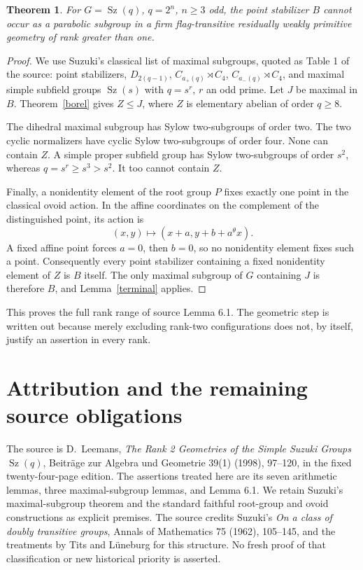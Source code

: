 \documentclass[11pt,a4paper]{article}
\newtheorem{theorem}{Theorem}
\newcommand{\Sz}{\operatorname{Sz}}
\begin{document}
\begin{theorem}\label{exclude}
For $G=\Sz(q)$, $q=2^n$, $n\ge3$ odd, the point stabilizer $B$
cannot occur as a parabolic subgroup in a firm flag-transitive
residually weakly primitive geometry of rank greater than one.
\end{theorem}
\begin{proof}
We use Suzuki's classical list of maximal subgroups, quoted as
Table 1 of the source: point stabilizers, $D_{2(q-1)}$,
$C_{a_+(q)}\rtimes C_4$, $C_{a_-(q)}\rtimes C_4$, and maximal
simple subfield groups $\Sz(s)$ with $q=s^r$, $r$ an odd prime.
Let $J$ be maximal in $B$. Theorem~\ref{borel} gives $Z\le J$,
where $Z$ is elementary abelian of order $q\ge8$.

The dihedral maximal subgroup has Sylow two-subgroups of order
two. The two cyclic normalizers have cyclic Sylow two-subgroups
of order four. None can contain $Z$. A simple proper subfield
group has Sylow two-subgroups of order $s^2$, whereas
$q=s^r\ge s^3>s^2$. It too cannot contain $Z$.

Finally, a nonidentity element of the root group $P$ fixes exactly
one point in the classical ovoid action. In the affine coordinates
on the complement of the distinguished point, its action is
\[
                  (x,y)\longmapsto(x+a,y+b+a^\theta x).
\]
A fixed affine point forces $a=0$, then $b=0$, so no nonidentity
element fixes such a point. Consequently every point stabilizer
containing a fixed nonidentity element of $Z$ is $B$ itself.
The only maximal subgroup of $G$ containing $J$ is therefore
$B$, and Lemma~\ref{terminal} applies.
\end{proof}

This proves the full rank range of source Lemma 6.1. The geometric
step is written out because merely excluding rank-two configurations
does not, by itself, justify an assertion in every rank.

\section{Attribution and the remaining source obligations}
The source is D.~Leemans, \emph{The Rank 2 Geometries of the Simple
Suzuki Groups $\Sz(q)$}, Beitr\"age zur Algebra und Geometrie
39(1) (1998), 97--120, in the fixed twenty-four-page edition.
The assertions treated here are its seven arithmetic lemmas,
three maximal-subgroup lemmas, and Lemma 6.1. We retain Suzuki's
maximal-subgroup theorem and the standard faithful root-group and
ovoid constructions as explicit premises. The source credits
Suzuki's \emph{On a class of doubly transitive groups}, Annals of
Mathematics 75 (1962), 105--145, and the treatments by Tits and
L\"uneburg for this structure. No fresh proof of that classification
or new historical priority is asserted.
\end{document}
